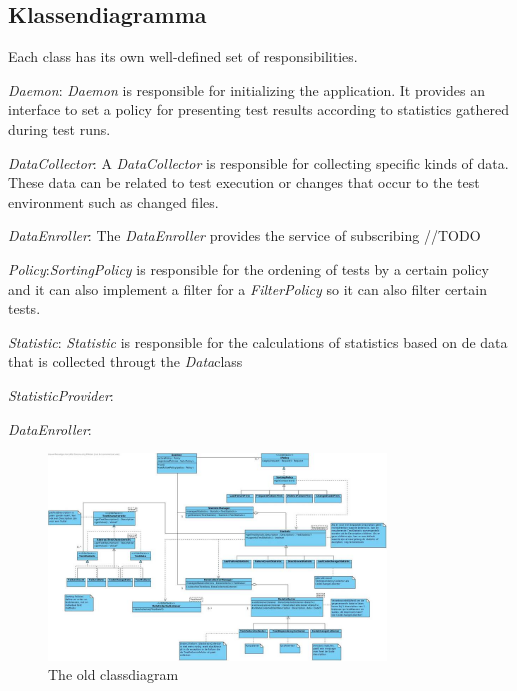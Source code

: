 \documentclass[i2]{oss}
\begin{document}
\subsection{Klassendiagramma}
\label{ssec:Klassendiagramma}

Each class has its own well-defined set of responsibilities.

\begin{description}

\item \emph{Daemon}: \emph{Daemon} is responsible for initializing the 
application. It provides an interface to set a policy for presenting 
test results according to statistics gathered during test runs.

\item \emph{DataCollector}: A \emph{DataCollector} is responsible for
collecting specific kinds of data. These data can be related to test
execution or changes that occur to the test environment such as changed
files.

\item \emph{DataEnroller}: The \emph{DataEnroller} provides the service
of subscribing //TODO

\item \emph{Policy}:\emph{SortingPolicy} is responsible for the ordening of tests by a certain policy and it can also implement a filter for a \emph{FilterPolicy} so it can also filter certain tests.

\item \emph{Statistic}: \emph{Statistic} is responsible for the calculations of statistics based on de data that is collected througt the \emph{Data}class

\item \emph{StatisticProvider}: 

\item \emph{DataEnroller}: 



\end{description}


\begin{figure}[tbp]
\begin{center}
    \includegraphics[width=0.8\textwidth]{klassendiagramOud}
    \caption{The old classdiagram}
	\label{fig:kd-oud}
\end{center}
\end{figure}
\end{document}
